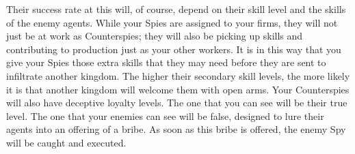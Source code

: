 Their success rate at this will, of course, depend on their skill level and the skills of the enemy agents.
While your Spies are assigned to your firms, they will not just be at work as Counterspies; they will also be picking up skills and contributing to production just as your other workers. It is in this way that you give your Spies those extra skills that they may need before they are sent to infiltrate another kingdom. The higher their secondary skill levels, the more likely it is that another kingdom will welcome them with open arms.
Your Counterspies will also have deceptive loyalty levels. The one that you can see will be their true level. The one that your enemies can see will be false, designed to lure their agents into an offering of a bribe. As soon as this bribe is offered, the enemy Spy will be caught and executed.